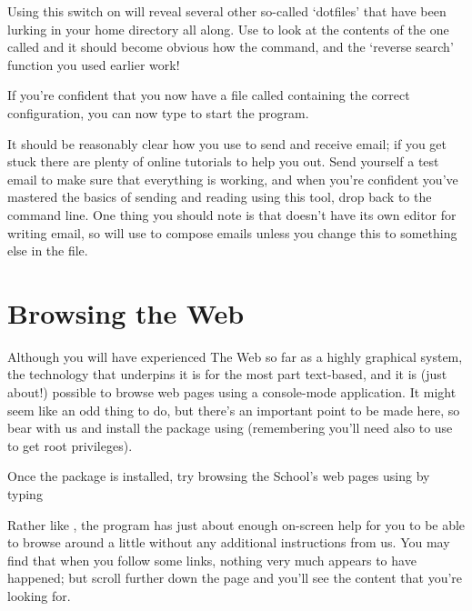 Using this switch on  will reveal several other so-called `dotfiles' that have been lurking in your home directory all along. Use  to look at the contents of the one called  and it should become obvious how the  command, and the `reverse search' function you used earlier work!

If you're confident that you now have a file called  containing the correct configuration, you can now type  to start the program. 

It should be reasonably clear how you use  to send and receive email; if you get stuck there are plenty of online tutorials to help you out. Send yourself a test email to make sure that everything is working, and when you're confident you've mastered the basics of sending and reading using this tool, drop back to the command line. One thing you should note is that  doesn't have its own editor for writing email, so will use  to compose emails unless you change this to something else in the  file. 

\section{Browsing the Web}

Although you will have experienced The Web so far as a highly graphical system, the technology that underpins it is for the most part text-based, and it is (just about!) possible to browse web pages using a console-mode application. It might seem like an odd thing to do, but there's an important point to be made here, so bear with us and install the  package using  (remembering you'll need also to use  to get root privileges). 

Once the package is installed, try browsing the School's web pages using  by typing


Rather like , the  program has just about enough on-screen help for you to be able to browse around a little without any additional instructions from us.
You may find that when you follow some links, nothing very much appears to have happened; but scroll further down the page and you'll see the content that you're looking for. 

